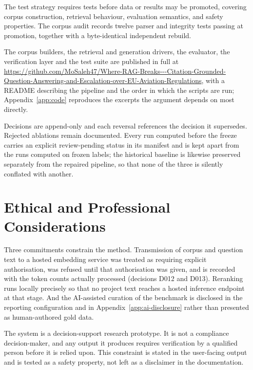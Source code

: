 The test strategy requires tests before data or results may be promoted, covering corpus construction, retrieval behaviour, evaluation semantics, and safety properties. The corpus audit records twelve parser and integrity tests passing at promotion, together with a byte-identical independent rebuild.

The corpus builders, the retrieval and generation drivers, the evaluator, the verification layer and the test suite are published in full at \url{https://github.com/MoSaleh47/Where-RAG-Breaks---Citation-Grounded-Question-Answering-and-Escalation-over-EU-Aviation-Regulations}, with a README describing the pipeline and the order in which the scripts are run; Appendix~\ref{app:code} reproduces the excerpts the argument depends on most directly.

Decisions are append-only and each reversal references the decision it supersedes. Rejected ablations remain documented. Every run computed before the freeze carries an explicit review-pending status in its manifest and is kept apart from the runs computed on frozen labels; the historical baseline is likewise preserved separately from the repaired pipeline, so that none of the three is silently conflated with another.

\section{Ethical and Professional Considerations}
\label{sec:method-ethics}

Three commitments constrain the method. Transmission of corpus and question text to a hosted embedding service was treated as requiring explicit authorisation, was refused until that authorisation was given, and is recorded with the token counts actually processed (decisions D012 and D013). Reranking runs locally precisely so that no project text reaches a hosted inference endpoint at that stage. And the \ac{AI}-assisted curation of the benchmark is disclosed in the reporting configuration and in Appendix~\ref{app:ai-disclosure} rather than presented as human-authored gold data.

The system is a decision-support research prototype. It is not a compliance decision-maker, and any output it produces requires verification by a qualified person before it is relied upon. This constraint is stated in the user-facing output and is tested as a safety property, not left as a disclaimer in the documentation.
